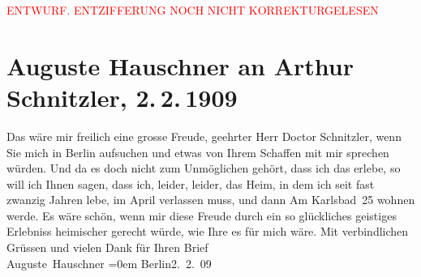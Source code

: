 
\begin{center}
            \textcolor{red}{ENTWURF. ENTZIFFERUNG NOCH NICHT KORREKTURGELESEN}
                      \end{center}
            
               \section[Auguste Hauschner an Arthur Schnitzler, 2. 2. 1909]{ Auguste Hauschner an Arthur Schnitzler, 2. 2. 1909}\nopagebreak{}\rehead{ }\begin{ledgroupsized}[t]{13cm}\normalsize\beginnumbering{} \toendnotes[C]{\smallbreak\pagebreak[2]} 
\toendnotes[C]{\smallbreak}\pstart
           \noindent{}{\pb}Das wäre mir freilich eine grosse Freude, geehrter Herr
               Doctor Schnitzler, wenn Sie mich in Berlin aufsuchen
               und etwas von Ihrem Schaffen mit mir sprechen würden. Und da es doch nicht zum
               Unmöglichen gehört, dass ich das erlebe, so will ich Ihnen sagen, dass ich, leider,
               leider, das Heim, in dem ich seit fast zwanzig Jahren lebe, im April
               verlassen muss, und dann Am {\pb}Karlsbad 25 wohnen werde.\pend
           \pstart
           Es wäre schön, wenn mir diese Freude durch ein so glückliches geistiges Erlebniss
               heimischer gerecht würde, wie Ihre \label{K_L02588-1v}\label{K_L02588-1h} es für mich wäre.\pend
           \pstart
           Mit verbindlichen Grüssen und vielen Dank für Ihren Brief{\\[\baselineskip]}\spacefill\mbox{Auguste Hauschner}\pend
           \leftskip=0em{}\pstart
           Berlin2. 2. 09\pend
           \endnumbering{}\end{ledgroupsized}  \newcommand{\dateiname}{L02588}\newcommand{\titel}{Auguste Hauschner an Arthur Schnitzler, 2. 2. 1909}\newcommand{\editorInnen}{Martin Anton Müller und Laura Untner}
      